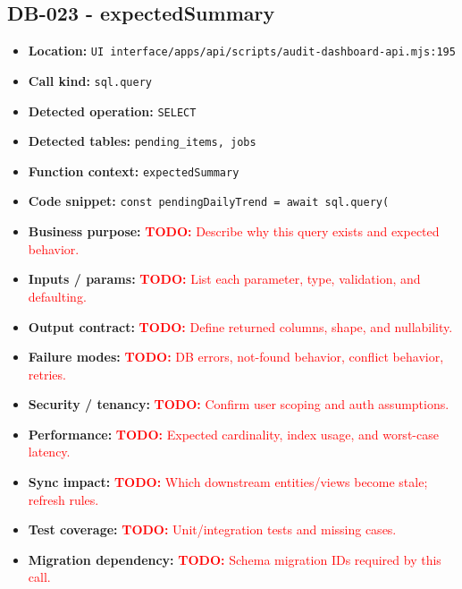 \documentclass[11pt]{article}
\newcommand{\todoitem}[1]{\textcolor{red}{\textbf{TODO:} #1}}
\begin{document}
\subsection{DB-023 - expectedSummary}
\begin{itemize}[leftmargin=1.5em]
\item \textbf{Location:} \texttt{UI interface/apps/api/scripts/audit-dashboard-api.mjs:195}
\item \textbf{Call kind:} \texttt{sql.query}
\item \textbf{Detected operation:} \texttt{SELECT}
\item \textbf{Detected tables:} \texttt{pending\_items, jobs}
\item \textbf{Function context:} \texttt{expectedSummary}
\item \textbf{Code snippet:} \texttt{const pendingDailyTrend = await sql.query(}
\item \textbf{Business purpose:} \todoitem{Describe why this query exists and expected behavior.}
\item \textbf{Inputs / params:} \todoitem{List each parameter, type, validation, and defaulting.}
\item \textbf{Output contract:} \todoitem{Define returned columns, shape, and nullability.}
\item \textbf{Failure modes:} \todoitem{DB errors, not-found behavior, conflict behavior, retries.}
\item \textbf{Security / tenancy:} \todoitem{Confirm user scoping and auth assumptions.}
\item \textbf{Performance:} \todoitem{Expected cardinality, index usage, and worst-case latency.}
\item \textbf{Sync impact:} \todoitem{Which downstream entities/views become stale; refresh rules.}
\item \textbf{Test coverage:} \todoitem{Unit/integration tests and missing cases.}
\item \textbf{Migration dependency:} \todoitem{Schema migration IDs required by this call.}
\end{itemize}
\end{document}
